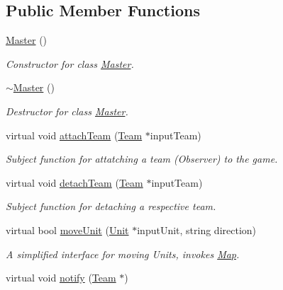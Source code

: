 \subsection*{Public Member Functions}
\begin{DoxyCompactItemize}
\item 
\hypertarget{class_master_ab917c3763c181ccad46ac6da8843c6e9}{}\hyperlink{class_master_ab917c3763c181ccad46ac6da8843c6e9}{Master} ()\label{class_master_ab917c3763c181ccad46ac6da8843c6e9}

\begin{DoxyCompactList}\small\item\em Constructor for class \hyperlink{class_master}{Master}. \end{DoxyCompactList}\item 
\hypertarget{class_master_a20f70958ed75532ba672af1b780f59eb}{}\hyperlink{class_master_a20f70958ed75532ba672af1b780f59eb}{$\sim$\+Master} ()\label{class_master_a20f70958ed75532ba672af1b780f59eb}

\begin{DoxyCompactList}\small\item\em Destructor for class \hyperlink{class_master}{Master}. \end{DoxyCompactList}\item 
\hypertarget{class_master_a8cdf84a9445b6e847d43c3c57fa2a8d2}{}virtual void \hyperlink{class_master_a8cdf84a9445b6e847d43c3c57fa2a8d2}{attach\+Team} (\hyperlink{class_team}{Team} $\ast$input\+Team)\label{class_master_a8cdf84a9445b6e847d43c3c57fa2a8d2}

\begin{DoxyCompactList}\small\item\em Subject function for attatching a team (Observer) to the game. \end{DoxyCompactList}\item 
\hypertarget{class_master_a876e27a128fd3ce416e06f87097df2ae}{}virtual void \hyperlink{class_master_a876e27a128fd3ce416e06f87097df2ae}{detach\+Team} (\hyperlink{class_team}{Team} $\ast$input\+Team)\label{class_master_a876e27a128fd3ce416e06f87097df2ae}

\begin{DoxyCompactList}\small\item\em Subject function for detaching a respective team. \end{DoxyCompactList}\item 
virtual bool \hyperlink{class_master_aed3a45ecf7482d60e4738701486f011c}{move\+Unit} (\hyperlink{class_unit}{Unit} $\ast$input\+Unit, string direction)
\begin{DoxyCompactList}\small\item\em A simplified interface for moving Units, invokes \hyperlink{class_map}{Map}. \end{DoxyCompactList}\item 
\hypertarget{class_master_aa22e3edd94d966011e1874a2bce1d664}{}virtual void \hyperlink{class_master_aa22e3edd94d966011e1874a2bce1d664}{notify} (\hyperlink{class_team}{Team} $\ast$)\label{class_master_aa22e3edd94d966011e1874a2bce1d664}


\end{DoxyCompactItemize}
